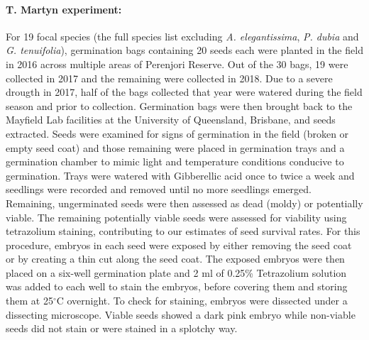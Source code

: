 \begin{refsection}
        \paragraph{T. Martyn experiment:}
        For 19 focal species (the full species list excluding \textit{A. elegantissima}, \textit{P. dubia} and \textit{G. tenuifolia}), germination bags containing 20 seeds each were planted in the field in 2016 across multiple areas of Perenjori Reserve. Out of the 30 bags, 19 were collected in 2017 and the remaining were collected in 2018. Due to a severe drougth in 2017, half of the bags collected that year were watered during the field season and prior to collection. Germination bags were then brought back to the Mayfield Lab facilities at the University of Queensland, Brisbane, and seeds extracted. Seeds were examined for signs of germination in the field (broken or empty seed coat) and those remaining were placed in germination trays and a germination chamber to mimic light and temperature conditions conducive to germination. Trays were watered with Gibberellic acid once to twice a week and seedlings were recorded and removed until no more seedlings emerged. Remaining, ungerminated seeds were then assessed as dead (moldy) or potentially viable. The remaining potentially viable seeds were assessed for viability using tetrazolium staining, contributing to our estimates of seed survival rates. For this procedure, embryos in each seed were exposed by either removing the seed coat or by creating a thin cut along the seed coat. The exposed embryos were then placed on a six-well germination plate and 2 ml of 0.25\% Tetrazolium solution was added to each well to stain the embryos, before covering them and storing them at 25$^{\circ}$C overnight. To check for staining, embryos were dissected under a dissecting microscope. Viable seeds showed a dark pink embryo while non-viable seeds did not stain or were stained in a splotchy way.



\end{refsection}
